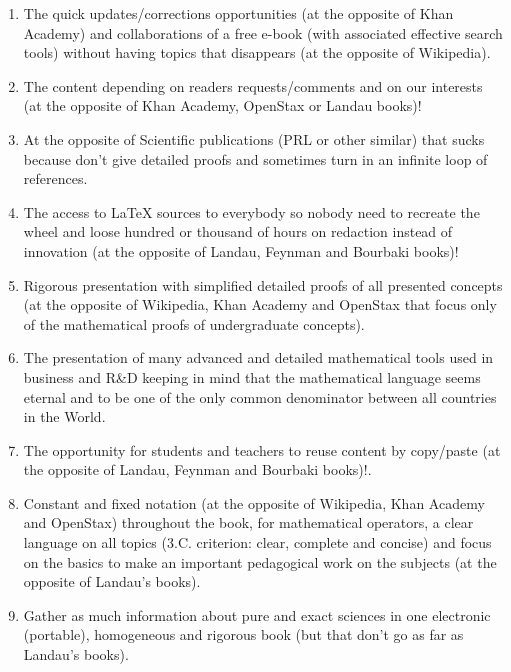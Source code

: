 \begin{enumerate}
		\item The quick updates/corrections opportunities (at the opposite of Khan Academy) and collaborations of a free e-book (with associated effective search tools) without having topics that disappears (at the opposite of Wikipedia).

		\item The content depending on readers requests/comments and on our interests (at the opposite of Khan Academy, OpenStax or Landau books)!
		
		\item At the opposite of Scientific publications (PRL or other similar) that sucks because don't give detailed proofs and sometimes turn in an infinite loop of references.
		
		\item The access to \LaTeX{} sources to everybody so nobody need to recreate the wheel and loose hundred or thousand of hours on redaction instead of innovation (at the opposite of Landau, Feynman and Bourbaki books)!

		\item Rigorous presentation with simplified detailed proofs of all presented concepts (at the opposite of Wikipedia, Khan Academy and OpenStax that focus only of the mathematical proofs of undergraduate concepts).

		\item The presentation of many advanced and detailed mathematical tools used in business and R\&D keeping in mind that the mathematical language seems eternal and to be one of the only common denominator between all countries in the World.

		\item The opportunity for students and teachers to reuse content by copy/paste (at the opposite of Landau, Feynman and Bourbaki books)!.

		\item Constant and fixed notation (at the opposite of Wikipedia, Khan Academy and OpenStax) throughout the book, for mathematical operators, a clear language on all topics (3.C. criterion: clear, complete and concise) and focus on the basics to make an important pedagogical work on the subjects (at the opposite of Landau's books).

		\item Gather as much information about pure and exact sciences in one electronic (portable), homogeneous and rigorous book (but that don't go as far as Landau's books).


\end{enumerate}
